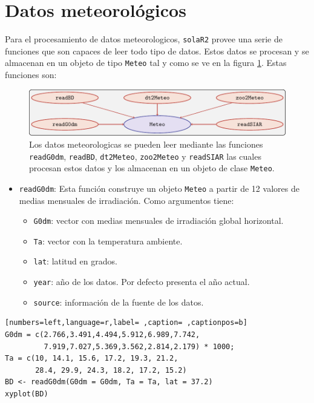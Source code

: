 \section{Datos meteorológicos}
\label{sec:org3b23fa2}
\label{sec:datos-meteorologicos}
Para el procesamiento de datos meteorologicos, \texttt{solaR2} provee una serie de funciones que son capaces de leer todo tipo de datos. Estos datos se procesan y se almacenan en un objeto de tipo \texttt{Meteo} tal y como se ve en la figura \ref{fig:meteo}. Estas funciones son:
\begin{figure}[htbp]
\centering
\includegraphics[keepaspectratio,width=\textwidth,height=0.5\textheight]{figuras/meteo.pdf}
\caption{Los datos meteorologicas se pueden leer mediante las funciones \texttt{readG0dm}, \texttt{readBD}, \texttt{dt2Meteo}, \texttt{zoo2Meteo} y \texttt{readSIAR} las cuales procesan estos datos y los almacenan en un objeto de clase \texttt{Meteo}. \label{fig:meteo}}
\end{figure}
\begin{itemize}
\item \texttt{readG0dm}: Esta función construye un objeto \texttt{Meteo} a partir de 12 valores de medias mensuales de irradiación.
Como argumentos tiene:
\begin{itemize}
\item \texttt{G0dm}: vector con medias mensuales de irradiación global horizontal.
\item \texttt{Ta}: vector con la temperatura ambiente.
\item \texttt{lat}: latitud en grados.
\item \texttt{year}: año de los datos. Por defecto presenta el año actual.
\item \texttt{source}: información de la fuente de los datos.
\end{itemize}
\end{itemize}
\begin{lstlisting}[numbers=left,language=r,label= ,caption= ,captionpos=b]
G0dm = c(2.766,3.491,4.494,5.912,6.989,7.742,
         7.919,7.027,5.369,3.562,2.814,2.179) * 1000;
Ta = c(10, 14.1, 15.6, 17.2, 19.3, 21.2,
       28.4, 29.9, 24.3, 18.2, 17.2, 15.2)
BD <- readG0dm(G0dm = G0dm, Ta = Ta, lat = 37.2)
xyplot(BD)
\end{lstlisting}

